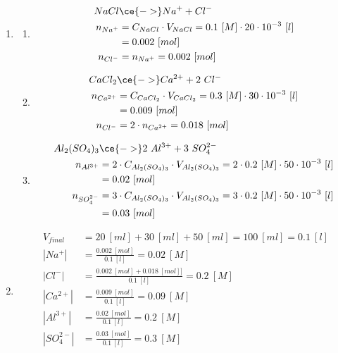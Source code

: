 \documentclass[
  11pt,
  a4paper,
  openany]{book}
\providecommand{\tightlist}{%
  \setlength{\itemsep}{0pt}\setlength{\parskip}{0pt}}
\begin{document}
\begin{Answer}

\begin{enumerate}
\def\labelenumi{\arabic{enumi}.}
\tightlist
\item
  \begin{enumerate}
  \def\labelenumii{\alph{enumii}.}
  \tightlist
  \item
    \[
      \begin{split}
        NaCl &\ce{->} Na^+ + Cl^- \\
        n_{Na^+} &= C_{NaCl} \cdot V_{NaCl} = 0.1\ [M] \cdot 20 \cdot 10^{-3}\ [l] \\
        &= 0.002\ [mol] \\
        n_{Cl^-} &= n_{Na^+} = 0.002\ [mol]
      \end{split}
      \]
  \item
    \[
      \begin{split}
        CaCl_2 &\ce{->} Ca^{2+} + 2\ Cl^- \\
        n_{Ca^{2+}} &= C_{CaCl_2} \cdot V_{CaCl_2} = 0.3\ [M] \cdot 30 \cdot 10^{-3}\ [l] \\
        &= 0.009\ [mol] \\
        n_{Cl^-} &= 2 \cdot n_{Ca^{2+}} = 0.018\ [mol]
      \end{split}
      \]
  \item
    \[
      \begin{split}
        Al_2(SO_4)_3 &\ce{->} 2\ Al^{3+} + 3\ SO_4^{2-} \\
        n_{Al^{3+}} &= 2 \cdot C_{Al_2(SO_4)_3} \cdot V_{Al_2(SO_4)_3} = 2 \cdot 0.2\ [M] \cdot 50 \cdot 10^{-3}\ [l] \\
        &= 0.02\ [mol] \\
        n_{SO_4^{2-}} &= 3 \cdot C_{Al_2(SO_4)_3} \cdot V_{Al_2(SO_4)_3} = 3 \cdot 0.2\ [M] \cdot 50 \cdot 10^{-3}\ [l] \\
        &= 0.03\ [mol]
      \end{split}
      \]
  \end{enumerate}
\item
  \[
   \begin{split}
   V_{final} &= 20\ [ml] + 30\ [ml] + 50\ [ml] = 100\ [ml] = 0.1\ [l] \\
   |Na^+| &= \frac{0.002\ [mol]}{0.1\ [l]} = 0.02\ [M] \\
   |Cl^-| &= \frac{0.002\ [mol] + 0.018\ [mol]]}{0.1\ [l]} = 0.2\ [M] \\
   |Ca^{2+}| &= \frac{0.009\ [mol]}{0.1\ [l]} = 0.09\ [M] \\
   |Al^{3+}| &= \frac{0.02\ [mol]}{0.1\ [l]} = 0.2\ [M] \\
   |SO_4^{2-}| &= \frac{0.03\ [mol]}{0.1\ [l]} = 0.3\ [M] \\
   \end{split}
  \]
\end{enumerate}

\end{Answer}
\end{document}
